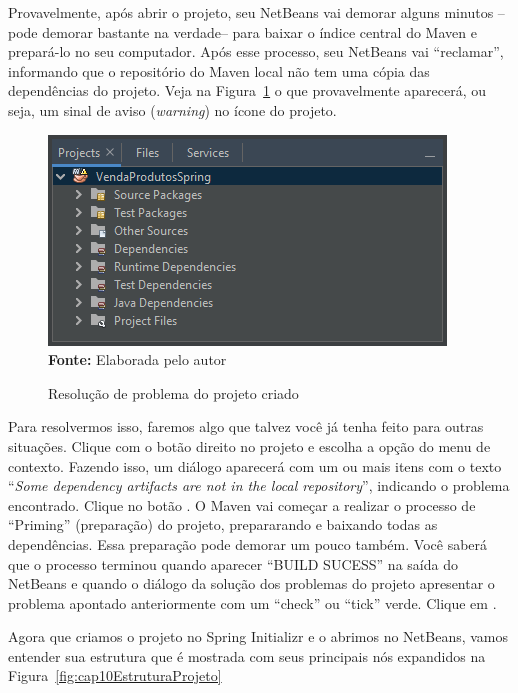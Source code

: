 Provavelmente, após abrir o projeto, seu NetBeans vai demorar alguns minutos --pode demorar bastante na verdade-- para baixar o índice central do Maven e prepará-lo no seu computador. Após esse processo, seu NetBeans vai ``reclamar'', informando que o repositório do Maven local não tem uma cópia das dependências do projeto. Veja na Figura~\ref{fig:cap10ConfProjeto03} o que provavelmente aparecerá, ou seja, um sinal de aviso (\textit{warning}) no ícone do projeto.

\FloatBarrier
\begin{figure}[!htbp]
    \centering
    \caption{Resolução de problema do projeto criado}
    \includegraphics[scale=1]{imagens/cap10ConfProjeto03}
    \\\textbf{Fonte:} Elaborada pelo autor
    \label{fig:cap10ConfProjeto03}
\end{figure}
\FloatBarrier

Para resolvermos isso, faremos algo que talvez você já tenha feito para outras situações. Clique com o botão direito no projeto e escolha a opção  do menu de contexto. Fazendo isso, um diálogo aparecerá com um ou mais itens com o texto ``\textit{Some dependency artifacts are not in the local repository}'', indicando o problema encontrado. Clique no botão . O Maven vai começar a realizar o processo de ``Priming'' (preparação) do projeto, prepararando e baixando todas as dependências. Essa preparação pode demorar um pouco também. Você saberá que o processo terminou quando aparecer ``BUILD SUCESS'' na saída do NetBeans e quando o diálogo da solução dos problemas do projeto apresentar o problema apontado anteriormente com um ``check'' ou ``tick'' verde. Clique em .

Agora que criamos o projeto no Spring Initializr e o abrimos no NetBeans, vamos entender sua estrutura que é mostrada com seus principais nós expandidos na Figura~\ref{fig:cap10EstruturaProjeto}

